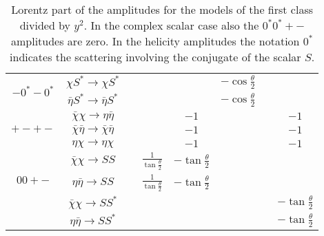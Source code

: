 \documentclass[a4paper,11pt]{article}
\begin{document}
\begin{table}[t!]
\begin{center}
{\begin{tabular}{| c|  c ||  c  | c  |  c |  c  | c | c| }
\hline						
\multirow{2}{*}{$-0^*-0^*$}	& $\chi S^* \to \chi S^*$ &  & &  &$-\cos{\frac{\theta}{2}}$  & & \\
					& $\bar\eta S^* \to\bar \eta S^*$ &  & &  &$-\cos{\frac{\theta}{2}}$  & & \\				
\hline
\hline						
\multirow{3}{*}{$+-+-$}	& $\bar\chi\chi \to \eta\bar\eta$ & & & $-1$ &  & & $-1$ \\
					& $\bar\chi\bar\eta \to \bar\chi\bar\eta$ & & & $-1$ &  & & $-1$ \\	
					& $\eta\chi\to\eta\chi$ & & & $-1$ &  & & $-1$ \\						
\hline	
\multirow{3}{*}{$00+-$}	& $\bar\chi\chi \to SS$ & & $\frac{1}{\tan{\frac{\theta}{2}}}$ & $-\tan{\frac{\theta}{2}}$ &  & &  \\
					& $\eta\bar\eta \to SS$ & & $\frac{1}{\tan{\frac{\theta}{2}}}$ & $-\tan{\frac{\theta}{2}}$ &  & &  \\	
					\hline	
\multirow{2}{*}{$00^*+-$}	& $\bar\chi\chi \to SS^*$ & &  &  &  & &  $-\tan{\frac{\theta}{2}}$\\
					& $\eta\bar\eta \to SS^*$ & &  & &  & & $-\tan{\frac{\theta}{2}}$  \\	
\hline	
\end{tabular}  
}
\end{center}
\caption{Lorentz part of the amplitudes for the models of the first class divided by $y^2$. In the complex scalar case also the $0^*0^*+-$ amplitudes are zero. In the helicity amplitudes the notation 
$0^*$ indicates the scattering involving the conjugate of the scalar $S$.} 
\label{tab:lorentz_dirac}
\end{table}
\end{document}
